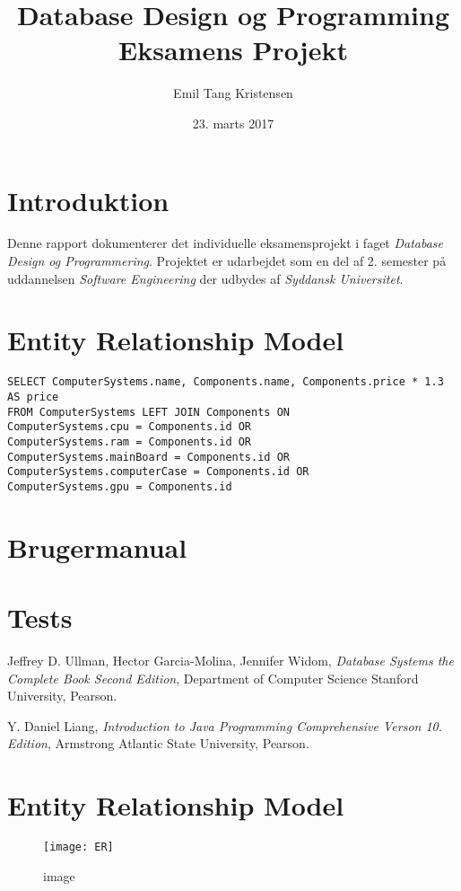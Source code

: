 \documentclass[11pt,a4paper]{article}
\title{\textbf{Database Design og Programming Eksamens Projekt}}
\author{Emil Tang Kristensen}
\date{23. marts 2017}
\begin{document}
\maketitle
\tableofcontents

\section{Introduktion}
Denne rapport dokumenterer det individuelle eksamensprojekt i faget \emph{Database Design og Programmering}.
Projektet er udarbejdet som en del af 2. semester på uddannelsen \emph{Software Engineering} der udbydes af \emph{Syddansk Universitet}.


\section{Entity Relationship Model}

\begin{lstlisting}[caption=Some Code]
SELECT ComputerSystems.name, Components.name, Components.price * 1.3 AS price
FROM ComputerSystems LEFT JOIN Components ON
ComputerSystems.cpu = Components.id OR
ComputerSystems.ram = Components.id OR
ComputerSystems.mainBoard = Components.id OR
ComputerSystems.computerCase = Components.id OR
ComputerSystems.gpu = Components.id
\end{lstlisting}

\section{Brugermanual}

\section{Tests}

\begin{thebibliography}{9}

Jeffrey D. Ullman, Hector Garcia-Molina, Jennifer Widom,
\emph{Database Systems the Complete Book Second Edition},
Department of Computer Science Stanford University,
Pearson.

Y. Daniel Liang,
\emph{Introduction to Java Programming Comprehensive Verson 10. Edition},
Armstrong Atlantic State University,
Pearson.

\end{thebibliography}

\appendix
\section{Entity Relationship Model}
\begin{figure}[htbp]
  \centering
  \texttt{[image: ER]}
  \caption{ image}
\end{figure}
\end{document}
